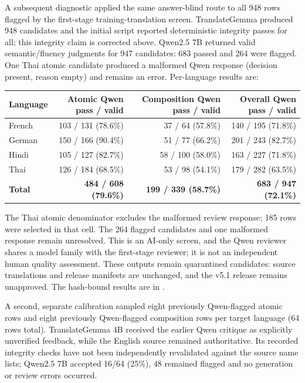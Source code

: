 \documentclass[10pt,a4paper]{article}
\begin{document}
A subsequent diagnostic applied the same answer-blind route to all 948 rows flagged by the first-stage training-translation screen. TranslateGemma produced 948 candidates and the initial script reported deterministic integrity passes for all; this integrity claim is corrected above. Qwen2.5 7B returned valid semantic/fluency judgments for 947 candidates: 683 passed and 264 were flagged. One Thai atomic candidate produced a malformed Qwen response (decision present, reason empty) and remains an error. Per-language results are:

\begin{center}
\small
\begin{tabular}{lrrr}
\toprule
Language & Atomic Qwen pass / valid & Composition Qwen pass / valid & Overall Qwen pass / valid \\
\midrule
French & 103 / 131 (78.6\%) & 37 / 64 (57.8\%) & 140 / 195 (71.8\%) \\
German & 150 / 166 (90.4\%) & 51 / 77 (66.2\%) & 201 / 243 (82.7\%) \\
Hindi & 105 / 127 (82.7\%) & 58 / 100 (58.0\%) & 163 / 227 (71.8\%) \\
Thai & 126 / 184 (68.5\%) & 53 / 98 (54.1\%) & 179 / 282 (63.5\%) \\
\textbf{Total} & \textbf{484 / 608 (79.6\%)} & \textbf{199 / 339 (58.7\%)} & \textbf{683 / 947 (72.1\%)} \\
\bottomrule
\end{tabular}
\end{center}

The Thai atomic denominator excludes the malformed review response; 185 rows were selected in that cell. The 264 flagged candidates and one malformed response remain unresolved. This is an AI-only screen, and the Qwen reviewer shares a model family with the first-stage reviewer; it is not an independent human quality assessment. These outputs remain quarantined candidates: source translations and release manifests are unchanged, and the v5.1 release remains unapproved. The hash-bound results are in .

A second, separate calibration sampled eight previously Qwen-flagged atomic rows and eight previously Qwen-flagged composition rows per target language (64 rows total). TranslateGemma 4B received the earlier Qwen critique as explicitly unverified feedback, while the English source remained authoritative. Its recorded integrity checks have not been independently revalidated against the source name lists; Qwen2.5 7B accepted 16/64 (25\%), 48 remained flagged and no generation or review errors occurred.
\end{document}
